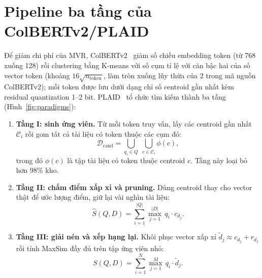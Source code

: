 \documentclass[a4paper,13pt]{extreport}
\theoremstyle{plain}
\begin{document}
\section{Pipeline ba tầng của ColBERTv2/PLAID}
\label{sec:plaid}
Để giảm chi phí của MVR, ColBERTv2~\cite{santhanam2022b} giảm số chiều embedding token (từ 768 xuống 128) rồi clustering bằng K-means với số cụm tỉ lệ với căn bậc hai của số vector token (khoảng $16\sqrt{n_{\text{token}}}$, làm tròn xuống lũy thừa của 2 trong mã nguồn ColBERTv2); mỗi token được lưu dưới dạng chỉ số centroid gần nhất kèm residual quantization 1--2 bit. PLAID~\cite{santhanam2022a} tổ chức tìm kiếm thành ba tầng (Hình~\ref{fig:paradigms}):
\begin{enumerate}[leftmargin=1.5cm]
  \item \textbf{Tầng I: sinh ứng viên.} Từ mỗi token truy vấn, lấy các centroid gần nhất $\mathcal{C}_i$ rồi gom tất cả tài liệu có token thuộc các cụm đó:
  \begin{equation}
  \mathcal{D}_{\mathrm{cand}}=\bigcup_{q_i\in Q}\;\bigcup_{c\in\mathcal{C}_i}\phi(c),
  \label{eq:cand}
  \end{equation}
  trong đó $\phi(c)$ là tập tài liệu có token thuộc centroid $c$. Tầng này loại bỏ hơn 98\% kho.
  \item \textbf{Tầng II: chấm điểm xấp xỉ và pruning.} Dùng centroid thay cho vector thật để ước lượng điểm, giữ lại vài nghìn tài liệu:
  \begin{equation}
  \hat S(Q,D)=\sum_{i=1}^{|Q|}\max_{j=1}^{|D|}\, q_i\cdot c_{d_j}.
  \label{eq:approx}
  \end{equation}
  \item \textbf{Tầng III: giải nén và xếp hạng lại.} Khôi phục vector xấp xỉ $\tilde d_j\approx c_{d_j}+r_{d_j}$ rồi tính MaxSim đầy đủ trên tập ứng viên nhỏ:
  \begin{equation}
  S(Q,D)=\sum_{i=1}^{N}\max_{j=1}^{M}\, q_i\cdot\tilde d_j .
  \label{eq:densemax}
  \end{equation}
\end{enumerate}
\end{document}
